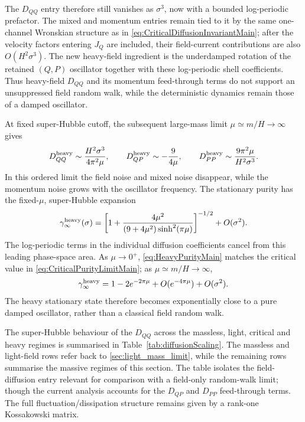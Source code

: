 \documentclass{article}
\numberwithin{equation}{section}
\begin{document}
	The \(D_{QQ}\) entry therefore still vanishes as \(\sigma^3\), now with a bounded log-periodic prefactor. The mixed and momentum entries remain tied to it by the same one-channel Wronskian structure as in \cref{eq:CriticalDiffusionInvariantMain}; after the velocity factors entering \(J_Q\) are included, their field-current contributions are also \(O(H^2\sigma^3)\). The new heavy-field ingredient is the underdamped rotation of the retained \((Q,P)\) oscillator together with these log-periodic shell coefficients. Thus heavy-field \(D_{QQ}\) and its momentum feed-through terms do not support an unsuppressed field random walk, while the deterministic dynamics remain those of a damped oscillator.

	At fixed super-Hubble cutoff, the subsequent large-mass limit \(\mu\simeq m/H\to\infty\) gives
	\begin{equation}
		D_{QQ}^{\rm heavy}
		\sim
		\frac{H^2\sigma^3}{4\pi^2\mu},
		\qquad
		D_{QP}^{\rm heavy}
		\sim
		-\frac{9}{4\mu},
		\qquad
		D_{PP}^{\rm heavy}
		\sim
		\frac{9\pi^2\mu}{H^2\sigma^3}.
		\label{eq:HeavyDiffusionLargeMassMain}
	\end{equation}
	In this ordered limit the field noise and mixed noise disappear, while the momentum noise grows with the oscillator frequency. The stationary purity has the fixed-\(\mu\), super-Hubble expansion
	\begin{equation}
		\gamma_\infty^{\rm heavy}(\sigma)
		=
		\left[
		1+
		\frac{4\mu^2}
		{(9+4\mu^2)\sinh^2(\pi\mu)}
		\right]^{-1/2}
		+O(\sigma^2).
		\label{eq:HeavyPurityMain}
	\end{equation}
	The log-periodic terms in the individual diffusion coefficients cancel from this leading phase-space area. As \(\mu\to0^+\), \cref{eq:HeavyPurityMain} matches the critical value in \cref{eq:CriticalPurityLimitMain}; as \(\mu\simeq m/H\to\infty\),
	\begin{equation}
		\gamma_\infty^{\rm heavy}
		=
		1-2e^{-2\pi\mu}
		+O(e^{-4\pi\mu})
		+O(\sigma^2).
	\end{equation}
	The heavy stationary state therefore becomes exponentially close to a pure damped oscillator, rather than a classical field random walk.

	The super-Hubble behaviour of the \(D_{QQ}\) across the massless, light, critical and heavy regimes is summarised in Table~\ref{tab:diffusionScaling}. The massless and light-field rows refer back to \cref{sec:light_mass_limit}, while the remaining rows summarise the massive regimes of this section. The table isolates the field-diffusion entry relevant for comparison with a field-only random-walk limit; though the current analysis accounts for the \(D_{QP}\) and \(D_{PP}\) feed-through terms. The full fluctuation/dissipation structure remains given by a rank-one Kossakowski matrix.
\end{document}
